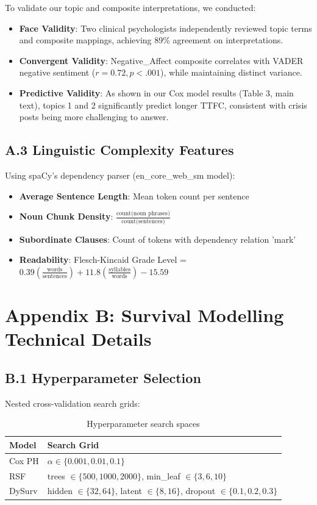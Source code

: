 \documentclass[letterpaper]{article} %
\begin{document}
To validate our topic and composite interpretations, we conducted:
\begin{itemize}
\item \textbf{Face Validity}: Two clinical psychologists independently reviewed topic terms and composite mappings, achieving 89\% agreement on interpretations.
\item \textbf{Convergent Validity}: Negative\_Affect composite correlates with VADER negative sentiment ($r = 0.72, p < .001$), while maintaining distinct variance.
\item \textbf{Predictive Validity}: As shown in our Cox model results (Table 3, main text), topics 1 and 2 significantly predict longer TTFC, consistent with crisis posts being more challenging to answer.
\end{itemize}
\subsection{A.3 Linguistic Complexity Features}

Using spaCy's dependency parser (en\_core\_web\_sm model):

\begin{itemize}
\item \textbf{Average Sentence Length}: Mean token count per sentence
\item \textbf{Noun Chunk Density}: $\frac{\text{count(noun phrases)}}{\text{count(sentences)}}$
\item \textbf{Subordinate Clauses}: Count of tokens with dependency relation 'mark'
\item \textbf{Readability}: Flesch-Kincaid Grade Level = $0.39\left(\frac{\text{words}}{\text{sentences}}\right) + 11.8\left(\frac{\text{syllables}}{\text{words}}\right) - 15.59$
\end{itemize}

\section{Appendix B: Survival Modelling Technical Details}

\subsection{B.1 Hyperparameter Selection}

Nested cross-validation search grids:
\begin{table}[h]
\centering
\caption{Hyperparameter search spaces}
\small
\begin{tabular}{ll}
\toprule
\textbf{Model} & \textbf{Search Grid} \\
\midrule
Cox PH & $\alpha \in \{0.001, 0.01, 0.1\}$ \\
RSF & trees $\in \{500, 1000, 2000\}$, min\_leaf $\in \{3, 6, 10\}$ \\
DySurv & hidden $\in \{32, 64\}$, latent $\in \{8, 16\}$, dropout $\in \{0.1, 0.2, 0.3\}$ \\
\bottomrule
\end{tabular}
\end{table}
\end{document}
